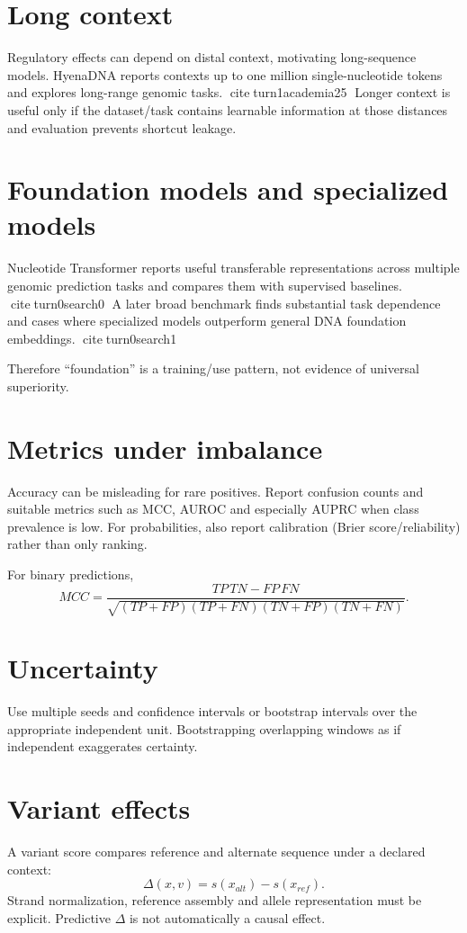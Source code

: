 \section{Long context}
Regulatory effects can depend on distal context, motivating long-sequence models. HyenaDNA reports contexts up to one million single-nucleotide tokens and explores long-range genomic tasks. citeturn1academia25 Longer context is useful only if the dataset/task contains learnable information at those distances and evaluation prevents shortcut leakage.

\section{Foundation models and specialized models}
Nucleotide Transformer reports useful transferable representations across multiple genomic prediction tasks and compares them with supervised baselines. citeturn0search0 A later broad benchmark finds substantial task dependence and cases where specialized models outperform general DNA foundation embeddings. citeturn0search1

Therefore ``foundation'' is a training/use pattern, not evidence of universal superiority.

\section{Metrics under imbalance}
Accuracy can be misleading for rare positives. Report confusion counts and suitable metrics such as MCC, AUROC and especially AUPRC when class prevalence is low. For probabilities, also report calibration (Brier score/reliability) rather than only ranking.

For binary predictions,
\[
MCC=\frac{TP\,TN-FP\,FN}{\sqrt{(TP+FP)(TP+FN)(TN+FP)(TN+FN)}}.
\]

\section{Uncertainty}
Use multiple seeds and confidence intervals or bootstrap intervals over the appropriate independent unit. Bootstrapping overlapping windows as if independent exaggerates certainty.

\section{Variant effects}
A variant score compares reference and alternate sequence under a declared context:
\[
\Delta(x,v)=s(x_{alt})-s(x_{ref}).
\]
Strand normalization, reference assembly and allele representation must be explicit. Predictive $\Delta$ is not automatically a causal effect.

